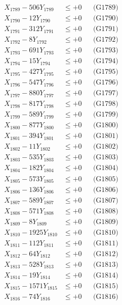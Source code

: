 \documentclass[a4paper,10pt]{article}
\begin{document}
{\begin{align}
X_{1789} - 506Y_{1789} &\leq +0 && \text{(G1789)} \\
X_{1790} - 12Y_{1790} &\leq +0 && \text{(G1790)} \\
\allowbreak
X_{1791} - 312Y_{1791} &\leq +0 && \text{(G1791)} \\
X_{1792} - 8Y_{1792} &\leq +0 && \text{(G1792)} \\
X_{1793} - 691Y_{1793} &\leq +0 && \text{(G1793)} \\
X_{1794} - 15Y_{1794} &\leq +0 && \text{(G1794)} \\
X_{1795} - 427Y_{1795} &\leq +0 && \text{(G1795)} \\
X_{1796} - 547Y_{1796} &\leq +0 && \text{(G1796)} \\
X_{1797} - 880Y_{1797} &\leq +0 && \text{(G1797)} \\
X_{1798} - 817Y_{1798} &\leq +0 && \text{(G1798)} \\
X_{1799} - 589Y_{1799} &\leq +0 && \text{(G1799)} \\
X_{1800} - 877Y_{1800} &\leq +0 && \text{(G1800)} \\
\allowbreak
X_{1801} - 394Y_{1801} &\leq +0 && \text{(G1801)} \\
X_{1802} - 11Y_{1802} &\leq +0 && \text{(G1802)} \\
X_{1803} - 535Y_{1803} &\leq +0 && \text{(G1803)} \\
X_{1804} - 182Y_{1804} &\leq +0 && \text{(G1804)} \\
X_{1805} - 573Y_{1805} &\leq +0 && \text{(G1805)} \\
X_{1806} - 136Y_{1806} &\leq +0 && \text{(G1806)} \\
X_{1807} - 589Y_{1807} &\leq +0 && \text{(G1807)} \\
X_{1808} - 571Y_{1808} &\leq +0 && \text{(G1808)} \\
X_{1809} - 8Y_{1809} &\leq +0 && \text{(G1809)} \\
X_{1810} - 1925Y_{1810} &\leq +0 && \text{(G1810)} \\
\allowbreak
X_{1811} - 112Y_{1811} &\leq +0 && \text{(G1811)} \\
X_{1812} - 64Y_{1812} &\leq +0 && \text{(G1812)} \\
X_{1813} - 528Y_{1813} &\leq +0 && \text{(G1813)} \\
X_{1814} - 19Y_{1814} &\leq +0 && \text{(G1814)} \\
X_{1815} - 1571Y_{1815} &\leq +0 && \text{(G1815)} \\
X_{1816} - 74Y_{1816} &\leq +0 && \text{(G1816)} \\

\end{align}}
\end{document}
